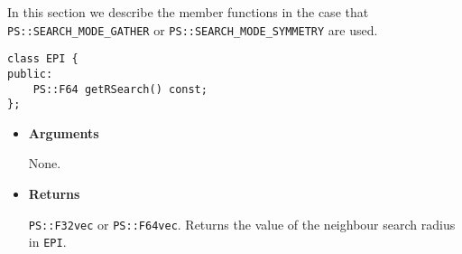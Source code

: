 In this section we describe the member functions in the case that \texttt{PS::SEARCH\_MODE\_GATHER} or \texttt{PS::SEARCH\_MODE\_SYMMETRY} are used.



\begin{screen}
\begin{verbatim}
class EPI {
public:
    PS::F64 getRSearch() const;
};
\end{verbatim}
\end{screen}

\begin{itemize}

\item {\bf Arguments}

  None.
  
\item {\bf Returns}

  \texttt{PS::F32vec} or \texttt{PS::F64vec}.
  Returns the value of the neighbour search radius in \texttt{EPI}.

\end{itemize}
